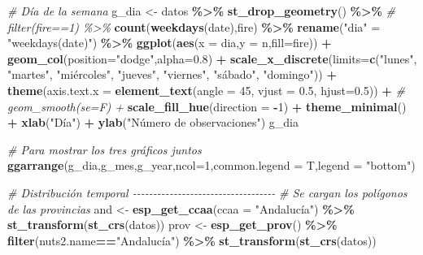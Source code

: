 \documentclass[12pt,a4paper,]{book}
\newenvironment{Shaded}{\begin{snugshade}}{\end{snugshade}}
\newcommand{\AttributeTok}[1]{\textcolor[rgb]{0.13,0.29,0.53}{#1}}
\newcommand{\CommentTok}[1]{\textcolor[rgb]{0.56,0.35,0.01}{\textit{#1}}}
\newcommand{\DecValTok}[1]{\textcolor[rgb]{0.00,0.00,0.81}{#1}}
\newcommand{\FloatTok}[1]{\textcolor[rgb]{0.00,0.00,0.81}{#1}}
\newcommand{\FunctionTok}[1]{\textcolor[rgb]{0.13,0.29,0.53}{\textbf{#1}}}
\newcommand{\NormalTok}[1]{#1}
\newcommand{\OtherTok}[1]{\textcolor[rgb]{0.56,0.35,0.01}{#1}}
\newcommand{\SpecialCharTok}[1]{\textcolor[rgb]{0.81,0.36,0.00}{\textbf{#1}}}
\newcommand{\StringTok}[1]{\textcolor[rgb]{0.31,0.60,0.02}{#1}}
\numberwithin{dummy}{section}
\theoremstyle{ocrenumbox}
\theoremstyle{blacknumex}
\theoremstyle{blacknumbox}
\theoremstyle{ocrenum}
\theoremstyle{ocrenum}
\begin{document}
\begin{Shaded}
\begin{Highlighting}[]
\CommentTok{\# Día de la semana}
\NormalTok{g\_dia }\OtherTok{\textless{}{-}}\NormalTok{ datos }\SpecialCharTok{\%\textgreater{}\%} 
  \FunctionTok{st\_drop\_geometry}\NormalTok{() }\SpecialCharTok{\%\textgreater{}\%} 
  \CommentTok{\# filter(fire==1) \%\textgreater{}\% }
  \FunctionTok{count}\NormalTok{(}\FunctionTok{weekdays}\NormalTok{(date),fire) }\SpecialCharTok{\%\textgreater{}\%} 
  \FunctionTok{rename}\NormalTok{(}\StringTok{"dia"} \OtherTok{=} \StringTok{"weekdays(date)"}\NormalTok{) }\SpecialCharTok{\%\textgreater{}\%} 
  \FunctionTok{ggplot}\NormalTok{(}\FunctionTok{aes}\NormalTok{(}\AttributeTok{x =}\NormalTok{ dia,}\AttributeTok{y =}\NormalTok{ n,}\AttributeTok{fill=}\NormalTok{fire)) }\SpecialCharTok{+}
  \FunctionTok{geom\_col}\NormalTok{(}\AttributeTok{position=}\StringTok{"dodge"}\NormalTok{,}\AttributeTok{alpha=}\FloatTok{0.8}\NormalTok{) }\SpecialCharTok{+}
  \FunctionTok{scale\_x\_discrete}\NormalTok{(}\AttributeTok{limits=}\FunctionTok{c}\NormalTok{(}\StringTok{"lunes"}\NormalTok{, }\StringTok{"martes"}\NormalTok{, }\StringTok{"miércoles"}\NormalTok{, }\StringTok{"jueves"}\NormalTok{, }\StringTok{"viernes"}\NormalTok{, }\StringTok{"sábado"}\NormalTok{, }\StringTok{"domingo"}\NormalTok{)) }\SpecialCharTok{+}
  \FunctionTok{theme}\NormalTok{(}\AttributeTok{axis.text.x =} \FunctionTok{element\_text}\NormalTok{(}\AttributeTok{angle =} \DecValTok{45}\NormalTok{, }\AttributeTok{vjust =} \FloatTok{0.5}\NormalTok{, }\AttributeTok{hjust=}\FloatTok{0.5}\NormalTok{)) }\SpecialCharTok{+}
 \CommentTok{\# geom\_smooth(se=F) +}
  \FunctionTok{scale\_fill\_hue}\NormalTok{(}\AttributeTok{direction =} \SpecialCharTok{{-}}\DecValTok{1}\NormalTok{) }\SpecialCharTok{+}
  \FunctionTok{theme\_minimal}\NormalTok{() }\SpecialCharTok{+}
  \FunctionTok{xlab}\NormalTok{(}\StringTok{"Día"}\NormalTok{) }\SpecialCharTok{+}
  \FunctionTok{ylab}\NormalTok{(}\StringTok{"Número de observaciones"}\NormalTok{)}
\NormalTok{g\_dia}

\CommentTok{\# Para mostrar los tres gráficos juntos}
\FunctionTok{ggarrange}\NormalTok{(g\_dia,g\_mes,g\_year,}\AttributeTok{ncol=}\DecValTok{1}\NormalTok{,}\AttributeTok{common.legend =}\NormalTok{ T,}\AttributeTok{legend =} \StringTok{"bottom"}\NormalTok{)}

\CommentTok{\# Distribución temporal {-}{-}{-}{-}{-}{-}{-}{-}{-}{-}{-}{-}{-}{-}{-}{-}{-}{-}{-}{-}{-}{-}{-}{-}{-}{-}{-}{-}{-}{-}{-}{-}{-}{-}{-}}
\CommentTok{\# Se cargan los polígonos de las provincias}
\NormalTok{and }\OtherTok{\textless{}{-}} \FunctionTok{esp\_get\_ccaa}\NormalTok{(}\AttributeTok{ccaa =} \StringTok{"Andalucía"}\NormalTok{) }\SpecialCharTok{\%\textgreater{}\%} \FunctionTok{st\_transform}\NormalTok{(}\FunctionTok{st\_crs}\NormalTok{(datos))}
\NormalTok{prov }\OtherTok{\textless{}{-}} \FunctionTok{esp\_get\_prov}\NormalTok{() }\SpecialCharTok{\%\textgreater{}\%} \FunctionTok{filter}\NormalTok{(nuts2.name}\SpecialCharTok{==}\StringTok{"Andalucía"}\NormalTok{) }\SpecialCharTok{\%\textgreater{}\%} \FunctionTok{st\_transform}\NormalTok{(}\FunctionTok{st\_crs}\NormalTok{(datos))}


\end{Highlighting}
\end{Shaded}
\end{document}
